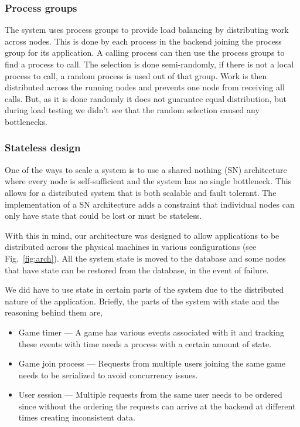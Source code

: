 \documentclass[11pt,a4paper]{report}
\begin{document}
\subsubsection{Process groups}
\label{sec:process_groups}
The system uses process groups\cite{process_groups} to provide load balancing by
distributing work across nodes.
This is done by each process in the backend joining the process group for its
application. A calling process can then use the process groups to find a
process to call. The selection is done semi-randomly, if there is not a local
process to call, a random process is used out of that group.
Work is then distributed across the running nodes and prevents one node from
receiving all calls. But, as it is done randomly it does not guarantee equal
distribution, but during load testing we didn't see that the random selection
caused any bottlenecks.

\subsubsection{Stateless design}
\label{sec:stateless}
One of the ways to scale a system is to use a shared nothing (SN)
architecture \cite{sn_arch}
where every node is self-sufficient and the system has no single bottleneck.
This allows for a distributed system that is both scalable and fault tolerant.
The implementation of a SN architecture adds a constraint that individual
nodes can only have state that could be lost or must be stateless.

With this in mind, our architecture was designed to allow applications to
be distributed across the physical machines in various configurations
(see Fig.~\ref{fig:arch}). All the system state is moved to the database
and some nodes that have state can be restored from the database, in
the event of failure.

We did have to use state in certain parts of the system due to the
distributed nature of the application. Briefly, the parts of the system
with state and the reasoning behind them are,

\begin{itemize}
\item Game timer --- A game has various events associated with it and
tracking these events with time needs a process with a certain amount
of state.
\item Game join process --- Requests from multiple users joining the same
game needs to be serialized to avoid concurrency issues.
\item User session --- Multiple requests from the same user needs to be
ordered since without the ordering the requests can arrive at the backend
at different times creating inconsistent data.
\end{itemize}
\end{document}
